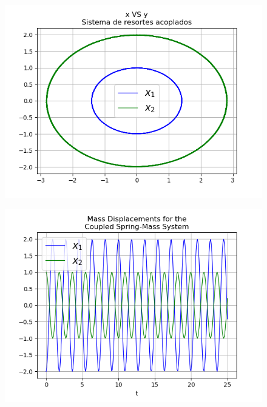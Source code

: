 \documentclass{article}
\begin{document}
\begin{figure}
\centering
\includegraphics[scale=0.4]{r3.png}
\label{figure: Resortes acoplados }
\end{figure}

\begin{figure}[h]
\centering
\includegraphics[scale=0.4]{r4.png}
\label{figure: Resortes acoplados }
\end{figure}
\end{document}
